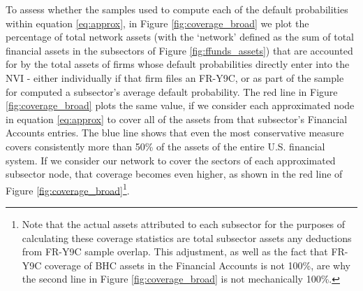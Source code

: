 To assess whether the samples used to compute each of the default probabilities within equation \ref{eq:approx}, in Figure \ref{fig:coverage_broad} we plot the percentage of total network assets (with the `network' defined as the sum of total financial assets in the subsectors of Figure \ref{fig:ffunds_assets}) that are accounted for by the total assets of firms whose default probabilities directly enter into the NVI - either individually if that firm files an FR-Y9C, or as part of the sample for computed a subsector's average default probability. The red line in Figure \ref{fig:coverage_broad} plots the same value, if we consider each approximated node in equation \ref{eq:approx} to cover all of the assets from that subsector's Financial Accounts entries. The blue line shows that even the most conservative measure covers consistently more than 50\% of the assets of the entire U.S. financial system. If we consider our network to cover the sectors of each approximated subsector node, that coverage becomes even higher, as shown in the red line of Figure \ref{fig:coverage_broad}\footnote{Note that the actual assets attributed to each subsector for the purposes of calculating these coverage statistics are total subsector assets  any deductions from FR-Y9C sample overlap. This adjustment, as well as the fact that FR-Y9C coverage of BHC assets in the Financial Accounts is not 100\%, are why the second line in Figure \ref{fig:coverage_broad} is not mechanically 100\%.}.



